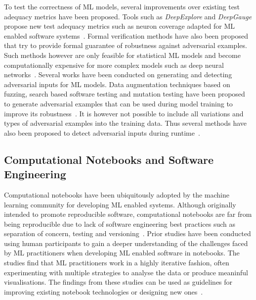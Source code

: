 \documentclass[acmsmall,screen,review,anonymous]{acmart}
\begin{document}
To test the correctness of ML models, several improvements over existing test adequacy metrics have been proposed. Tools such as \textit{DeepExplore} and \textit{DeepGauge} propose new test adequacy metrics such as neuron coverage adapted for ML enabled software systems~\cite{pei2017deepexplore, ma2018deepgauge, gerasimou2020importance}. Formal verification methods have also been proposed that try to provide formal guarantee of robustness against adversarial examples. Such methods however are only feasible for statistical ML models and become computationally expensive for more complex models such as deep neural networks~\cite{zhu2021deepmemory, baluta2021scalable}. Several works have been conducted on generating and detecting adversarial inputs for ML models. Data augmentation techniques based on fuzzing, search based software testing and mutation testing have been proposed to generate adversarial examples that can be used during model training to improve its robustness~\cite{braiek2019deepevolution, gao2020fuzz, wang2021robot, zhang2020white}. It is however not possible to include all variations and types of adversarial examples into the training data. Thus several methods have also been proposed to detect adversarial inputs during runtime~\cite{xiao2021self, wang2020dissector, wang2019adversarial, berend2020cats}.

\subsection{Computational Notebooks and Software
  Engineering}\label{sec:notebooks}

Computational notebooks have been ubiquitously adopted by the machine learning community for developing ML enabled systems. Although originally intended to promote reproducible software, computational notebooks are far from being reproducible due to lack of software engineering best practices such as separation of concern, testing and versioning~\cite{pimentel2019large, CITME}. Prior studies have been conducted using human participants to gain a deeper understanding of the challenges faced by ML practitioners when developing ML enabled software in notebooks. The studies find that ML practitioners work in a highly iterative fashion, often experimenting with multiple strategies to analyse the data or produce meaninful visualisations. The findings from these studies can be used as guidelines for improving existing notebook technologies or designing new ones~\cite{kandel2012enterprise, kery2018story, liu2019understanding, chattopadhyay2020wrong}.
\end{document}

